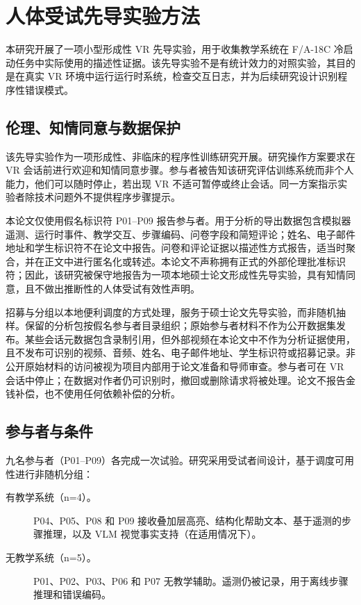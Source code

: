 \section{人体受试先导实验方法}\label{sec:method-pilot}

本研究开展了一项小型形成性 VR 先导实验，用于收集教学系统在 F/A-18C 冷启动任务中实际使用的描述性证据。该先导实验不是有统计效力的对照实验，其目的是在真实 VR 环境中运行运行时系统，检查交互日志，并为后续研究设计识别程序性错误模式。

\subsection{伦理、知情同意与数据保护}

该先导实验作为一项形成性、非临床的程序性训练研究开展。研究操作方案要求在 VR 会话前进行欢迎和知情同意步骤。参与者被告知该研究评估训练系统而非个人能力，他们可以随时停止，若出现 VR 不适可暂停或终止会话。同一方案指示实验者除技术问题外不提供程序步骤提示。

本论文仅使用假名标识符 P01--P09 报告参与者。用于分析的导出数据包含模拟器遥测、运行时事件、教学交互、步骤编码、问卷字段和简短评论；姓名、电子邮件地址和学生标识符不在论文中报告。问卷和评论证据以描述性方式报告，适当时聚合，并在正文中进行匿名化或转述。本论文不声称拥有正式的外部伦理批准标识符；因此，该研究被保守地报告为一项本地硕士论文形成性先导实验，具有知情同意，且不做出推断性的人体受试有效性声明。

招募与分组以本地便利调度的方式处理，服务于硕士论文先导实验，而非随机抽样。保留的分析包按假名参与者目录组织；原始参与者材料不作为公开数据集发布。某些会话元数据包含录制引用，但外部视频在本论文中不作为分析证据使用，且不发布可识别的视频、音频、姓名、电子邮件地址、学生标识符或招募记录。非公开原始材料的访问被视为项目内部用于论文准备和导师审查。参与者可在 VR 会话中停止；在数据对作者仍可识别时，撤回或删除请求将被处理。论文不报告金钱补偿，也不使用任何依赖补偿的分析。

\subsection{参与者与条件}

九名参与者（P01--P09）各完成一次试验。研究采用受试者间设计，基于调度可用性进行非随机分组：

\begin{description}
\item[有教学系统（n=4）。]P04、P05、P08 和 P09 接收叠加层高亮、结构化帮助文本、基于遥测的步骤推理，以及 VLM 视觉事实支持（在适用情况下）。
\item[无教学系统（n=5）。]P01、P02、P03、P06 和 P07 无教学辅助。遥测仍被记录，用于离线步骤推理和错误编码。
\end{description}

